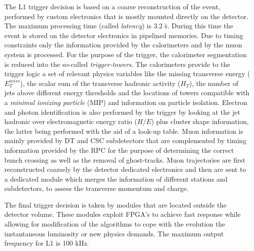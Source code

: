 The L1 trigger decision is based on a coarse reconstruction of the event, performed by custom electronics that is mostly mounted directly on the detector. 
The maximum processing time (called \emph{latency}) is 3.2 \u s. 
During this time the event is stored on the detector electronics in pipelined memories. 
Due to timing constraints only the information provided by the calorimeters and by the muon system is processed. 
For the purpose of the trigger, the calorimeter segmentation is reduced into the so-called \emph{trigger-towers}. 
The calorimeters provide to the trigger logic a set of relevant physics variables like the missing transverse energy ($E_T^{miss}$), the scalar sum of the transverse hadronic activity ($H_T$), the number of jets above different energy thresholds and the locations of towers compatible with a \emph{minimal ionizing particle} (MIP) and information on particle isolation. 
Electron and photon identification is also performed by the trigger by looking at the jet hadronic over electromagnetic energy ratio ($H/E$) plus cluster shape information, the latter being performed with the aid of a look-up table. 
Muon information is mainly provided by DT and CSC subdetectors that are complemented by timing information provided by the RPC for the purpose of determining the correct bunch crossing as well as the removal of ghost-tracks. 
Muon trajectories are first reconstructed coarsely by the detector dedicated electronics and then are sent to a dedicated module which merges the information of different stations and subdetectors, to assess the transverse momentum  and charge. 

The final trigger decision is taken by modules that are located outside the detector volume. These modules exploit FPGA's to achieve fast response while allowing for modification of the algorithms to cope with the evolution the instantaneous luminosity or new physics demands. The maximum output frequency for L1 is 100 kHz.

